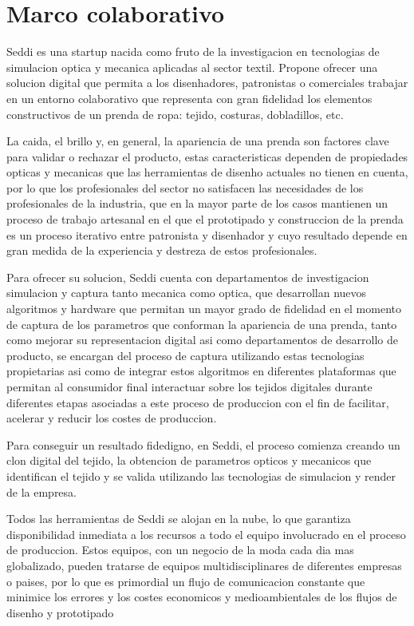 \chapter*{Marco colaborativo}
Seddi es una startup nacida como fruto de la investigacion en tecnologias de simulacion optica y mecanica aplicadas al sector textil.
Propone ofrecer una solucion digital que permita a los disenhadores, patronistas o comerciales trabajar en un entorno colaborativo que
representa con gran fidelidad los elementos constructivos de un prenda de ropa: tejido, costuras, dobladillos, etc.

La caida, el brillo y, en general, la apariencia de una prenda son factores clave para validar o rechazar el producto, estas caracteristicas
dependen de propiedades opticas y mecanicas que las herramientas de disenho actuales no tienen en cuenta, por lo que los profesionales del
sector no satisfacen las necesidades de los profesionales de la industria, que en la mayor parte de los casos mantienen un proceso de
trabajo artesanal en el que el prototipado y construccion de la prenda es un proceso iterativo entre patronista y disenhador y cuyo
resultado depende en gran medida de la experiencia y destreza de estos profesionales.

Para ofrecer su solucion, Seddi cuenta con departamentos de investigacion simulacion y captura tanto mecanica como optica, que desarrollan
nuevos algoritmos y hardware que permitan un mayor grado de fidelidad en el momento de captura de los parametros que conforman la apariencia
de una prenda, tanto como mejorar su representacion digital asi como departamentos de desarrollo de producto, se encargan del proceso de
captura utilizando estas tecnologias propietarias asi como de integrar estos algoritmos en diferentes plataformas que permitan al consumidor
final interactuar sobre los tejidos digitales durante diferentes etapas asociadas a este proceso de produccion con el fin de facilitar,
acelerar y reducir los costes de produccion.

Para conseguir un resultado fidedigno, en Seddi, el proceso comienza creando un clon digital del tejido, la obtencion de parametros opticos y
mecanicos que identifican el tejido y se valida utilizando las tecnologias de simulacion y render de la empresa. 

Todos las herramientas de Seddi se alojan en la nube, lo que garantiza disponibilidad inmediata a los recursos a todo el equipo involucrado en
el proceso de produccion. Estos equipos, con un negocio de la moda cada dia mas globalizado, pueden tratarse de equipos multidisciplinares de
diferentes empresas o paises, por lo que es primordial un flujo de comunicacion constante que minimice los errores y los costes economicos y
medioambientales de los flujos de disenho y prototipado

